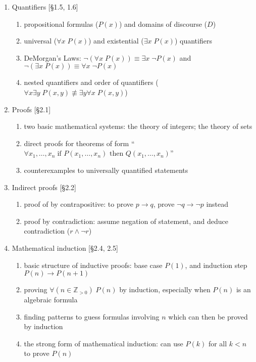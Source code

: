 \documentclass[11pt]{article}
\begin{document}
\begin{enumerate}
\item Quantifiers [\S1.5, 1.6]
\begin{enumerate}
\item propositional formulas ($P(x)$) and domains of discourse ($D$)
\item universal ($\forall x \; P(x)$) and existential ($\exists x \; P(x)$) quantifiers
\item DeMorgan's Laws: $\neg (\forall x \; P(x)) \equiv \exists x \; \neg P(x)$ and $\neg( \exists x \; P(x)) \equiv \forall x \; \neg P(x)$
\item nested quantifiers and order of quantifiers ($\forall x \exists y \; P(x,y) \not \equiv \exists y \forall x \; P(x,y)$)
\end{enumerate}

\item Proofs [\S2.1]
\begin{enumerate}
\item two basic mathematical systems: the theory of integers; the theory of sets
\item direct proofs for theorems of form ``$\forall x_1,\ldots,x_n \; \textrm{if $P(x_1,\ldots,x_n)$ then $Q(x_1,\ldots,x_n)$}$''
\item counterexamples to universally quantified statements
\end{enumerate}

\item Indirect proofs [\S2.2] 
\begin{enumerate}
\item proof of by contrapositive: to prove $p \to q$, prove $\neg q \to \neg p$ instead
\item proof by contradiction: assume negation of statement, and deduce contradiction ($r \wedge \neg r$)
\end{enumerate}

\item Mathematical induction [\S2.4, 2.5]
\begin{enumerate}
\item basic structure of inductive proofs: base case $P(1)$, and induction step $P(n) \to P(n+1)$
\item proving $\forall (n \in \mathbb{Z}_{>0}) \; P(n)$ by induction, especially when $P(n)$ is an algebraic formula
\item finding patterns to guess formulas involving $n$ which can then be proved by induction
\item the strong form of mathematical induction: can use $P(k)$ for all $k < n$ to prove $P(n)$
\end{enumerate}


\end{enumerate}
\end{document}
